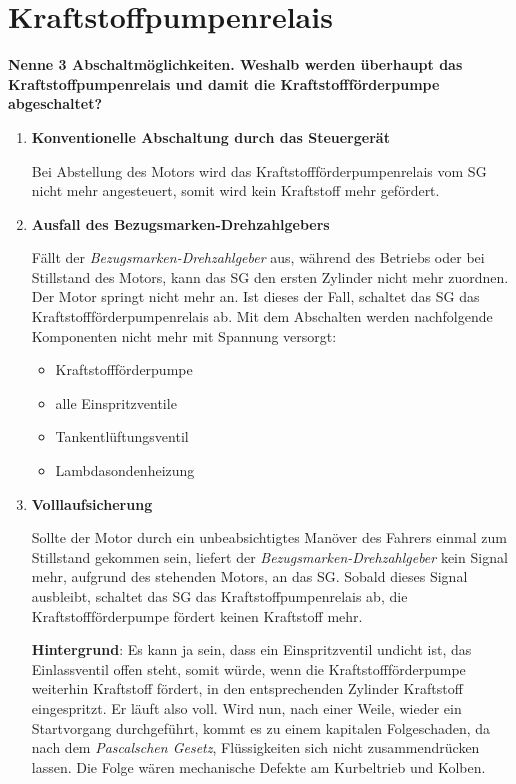 \section{Kraftstoffpumpenrelais}\label{kraftstoffpumpenrelais}

\textbf{Nenne 3 Abschaltmöglichkeiten. Weshalb werden überhaupt das
Kraftstoffpumpenrelais und damit die Kraftstoffförderpumpe
abgeschaltet?}

\begin{enumerate}
\item
  \textbf{Konventionelle Abschaltung durch das Steuergerät}

  Bei Abstellung des Motors wird das Kraftstoffförderpumpenrelais vom SG
  nicht mehr angesteuert, somit wird kein Kraftstoff mehr gefördert.
\item
  \textbf{Ausfall des Bezugsmarken-Drehzahlgebers}

  Fällt der \emph{Bezugsmarken-Drehzahlgeber} aus, während des Betriebs
  oder bei Stillstand des Motors, kann das SG den ersten Zylinder nicht
  mehr zuordnen. Der Motor springt nicht mehr an. Ist dieses der Fall,
  schaltet das SG das Kraftstoffförderpumpenrelais ab. Mit dem
  Abschalten werden nachfolgende Komponenten nicht mehr mit Spannung
  versorgt:

  \begin{itemize}
  \item
    Kraftstoffförderpumpe
  \item
    alle Einspritzventile
  \item
    Tankentlüftungsventil
  \item
    Lambdasondenheizung
  \end{itemize}
\item
  \textbf{Volllaufsicherung}

  Sollte der Motor durch ein unbeabsichtigtes Manöver des Fahrers einmal
  zum Stillstand gekommen sein, liefert der
  \emph{Bezugsmarken-Drehzahlgeber} kein Signal mehr, aufgrund des
  stehenden Motors, an das SG. Sobald dieses Signal ausbleibt, schaltet
  das SG das Kraftstoffpumpenrelais ab, die Kraftstoffförderpumpe
  fördert keinen Kraftstoff mehr.

  \textbf{Hintergrund}: Es kann ja sein, dass ein Einspritzventil
  undicht ist, das Einlassventil offen steht, somit würde, wenn die
  Kraftstoffförderpumpe weiterhin Kraftstoff fördert, in den
  entsprechenden Zylinder Kraftstoff eingespritzt. Er läuft also voll.
  Wird nun, nach einer Weile, wieder ein Startvorgang durchgeführt,
  kommt es zu einem kapitalen Folgeschaden, da nach dem
  \emph{Pascalschen Gesetz}, Flüssigkeiten sich nicht zusammendrücken
  lassen. Die Folge wären mechanische Defekte am Kurbeltrieb und Kolben.
\end{enumerate}

